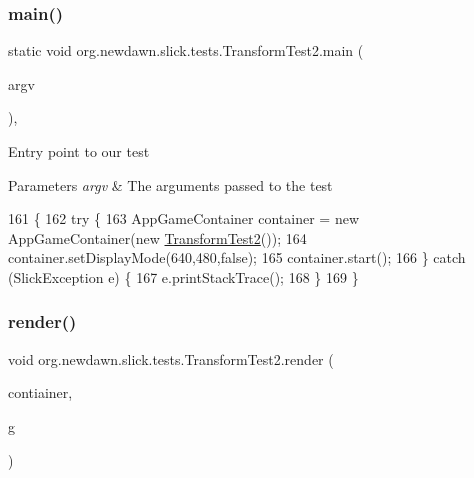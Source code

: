\subsubsection{\texorpdfstring{main()}{main()}}
{\footnotesize\ttfamily static void org.\+newdawn.\+slick.\+tests.\+Transform\+Test2.\+main (\begin{DoxyParamCaption}\item[{String \mbox{[}$\,$\mbox{]}}]{argv }\end{DoxyParamCaption})\hspace{0.3cm}{\ttfamily [inline]}, {\ttfamily [static]}}

Entry point to our test


\begin{DoxyParams}{Parameters}
{\em argv} & The arguments passed to the test \\
\hline
\end{DoxyParams}

\begin{DoxyCode}
161                                           \{
162       \textcolor{keywordflow}{try} \{
163          AppGameContainer container = \textcolor{keyword}{new} AppGameContainer(\textcolor{keyword}{new} \mbox{\hyperlink{classorg_1_1newdawn_1_1slick_1_1tests_1_1_transform_test2_a091378469dfc8827b0230c8719785455}{TransformTest2}}());
164          container.setDisplayMode(640,480,\textcolor{keyword}{false});
165          container.start();
166       \} \textcolor{keywordflow}{catch} (SlickException e) \{
167          e.printStackTrace();
168       \}
169    \}
\end{DoxyCode}
\mbox{\label{classorg_1_1newdawn_1_1slick_1_1tests_1_1_transform_test2_ad8cd70093a27c4115bf06bf2c9b82469}} 
\subsubsection{\texorpdfstring{render()}{render()}}
{\footnotesize\ttfamily void org.\+newdawn.\+slick.\+tests.\+Transform\+Test2.\+render (\begin{DoxyParamCaption}\item[{\mbox{\hyperlink{classorg_1_1newdawn_1_1slick_1_1_game_container}{Game\+Container}}}]{contiainer,  }\item[{\mbox{\hyperlink{classorg_1_1newdawn_1_1slick_1_1_graphics}{Graphics}}}]{g }\end{DoxyParamCaption})\hspace{0.3cm}{\ttfamily [inline]}}

